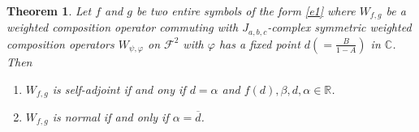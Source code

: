 \documentclass[reqno]{amsart}
\newtheorem{Theorem}{Theorem}
\theoremstyle{remark}
\theoremstyle{Definition}
\theoremstyle{remark}
\numberwithin{equation}{section}
\begin{document}
\begin{Theorem}\label{t4}
    Let $f$ and $g$ be two entire symbols of the form \eqref{e1} where $W_{f,g}$ be a weighted composition operator commuting with $J_{a,b,c}$-complex symmetric weighted  composition operators $W_{\psi, \varphi}$ on $\mathcal{F}^{2}$ with $\varphi$ has a fixed point 
$d(=\frac{B}{1-A})$ in $\mathbb{C}$. Then 
\begin{enumerate}
\item  $W_{f,g}$ is self-adjoint if and ony if $d= \alpha$ and $f(d),\beta,d,\alpha \in \mathbb{R}$. 
    \item $W_{f,g}$ is normal if and only if $\alpha=\overline{d}$.  
\end{enumerate}

\end{Theorem}
\end{document}
